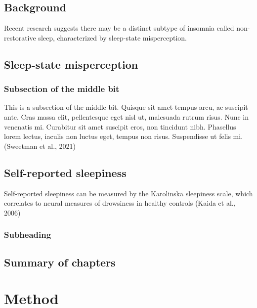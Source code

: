 \documentclass[12pt,a4paper,]{report}
\begin{document}
\section{Background}\label{background}

Recent research suggests there may be a distinct subtype of insomnia
called non-restorative sleep, characterized by sleep-state
misperception.

\section{Sleep-state misperception}\label{sleep-state-misperception}

\subsection{Subsection of the middle
bit}\label{subsection-of-the-middle-bit}

This is a subsection of the middle bit. Quisque sit amet tempus arcu, ac
suscipit ante. Cras massa elit, pellentesque eget nisl ut, malesuada
rutrum risus. Nunc in venenatis mi. Curabitur sit amet suscipit eros,
non tincidunt nibh. Phasellus lorem lectus, iaculis non luctus eget,
tempus non risus. Suspendisse ut felis mi. (Sweetman et al., 2021)

\section{Self-reported sleepiness}\label{self-reported-sleepiness}

Self-reported sleepiness can be measured by the Karolinska sleepiness
scale, which correlates to neural measures of drowsiness in healthy
controls (Kaida et al., 2006)

\subsection{Subheading}\label{subheading}

\section{Summary of chapters}\label{summary-of-chapters}

\newpage

\chapter{Method}\label{sec:method}
\end{document}
